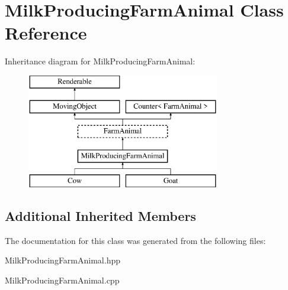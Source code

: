 \hypertarget{class_milk_producing_farm_animal}{}\section{Milk\+Producing\+Farm\+Animal Class Reference}
\label{class_milk_producing_farm_animal}
Inheritance diagram for Milk\+Producing\+Farm\+Animal\+:\begin{figure}[H]
\begin{center}
\leavevmode
\includegraphics[height=5.000000cm]{class_milk_producing_farm_animal}
\end{center}
\end{figure}
\subsection*{Additional Inherited Members}


The documentation for this class was generated from the following files\+:\begin{DoxyCompactItemize}
\item 
Milk\+Producing\+Farm\+Animal.\+hpp\item 
Milk\+Producing\+Farm\+Animal.\+cpp\end{DoxyCompactItemize}
